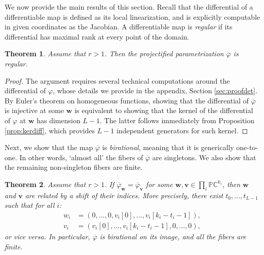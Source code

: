 \documentclass[twoside]{article}
\theoremstyle{plain}%
\newtheorem{thm}{Theorem}[section]
\theoremstyle{definition}
\theoremstyle{remark}
\begin{document}
We now provide the main results of this section. Recall that the differential of a differentiable map is defined as its local linearization, and is explicitly computable in given coordinates as the Jacobian. A differentiable map is \emph{regular} if its differential has maximal  rank at every point of the domain. 
\begin{thm}\label{thm:reg}
Assume that $r>1$. Then the projectified parametrization $\overline{\varphi}$ is regular. 
\end{thm}
\begin{proof}
The argument requires several technical computations around the differential of $\varphi$, whose details we provide in the appendix, Section \ref{sec:proofdet}. By Euler's theorem on homogeneous functions, showing that the differential of $\overline{\varphi}$ is injective at some $\mathbf{w}$ is equivalent to showing that the kernel of the differential of $\varphi$ at $\mathbf{w}$ has dimension $L-1$. The latter follows immediately from Proposition \ref{prop:kerdiff}, which provides $L-1$ independent generators for such kernel.     
\end{proof}
Next, we show that the map $\overline{\varphi}$ is \emph{birational}, meaning that it is generically one-to-one. In other words, `almost all' the fibers of $\overline{\varphi}$ are singletons. We also show that the remaining non-singleton fibers are finite.%
\begin{thm}\label{thm:mainbir} 
Assume that $r > 1$. If $\overline{\varphi}_{\mathbf{w}} = \overline{\varphi}_{\mathbf{v}}$ for some $\mathbf{w}, \mathbf{v} \in  \prod_{i} \mathbb{P}\mathbb{C}^{k_i}  $, then $\mathbf{w}$ and $\mathbf{v}$ are related by a shift of their indices. More precisely, there exist $t_0, \ldots, t_{L-1} $ such that for all $i$:
\begin{align}
w_i &= (0, \ldots, 0, v_i[0], \ldots, v_i[k_i - t_i - 1]), \\ 
v_i &= (v_i[0], \ldots, v_i[k_i - t_i - 1], 0, \ldots, 0),
\end{align}
or vice versa. In particular,  $\overline{\varphi}$ is birational on its image, and all the fibers are finite.   
\end{thm}
\end{document}
